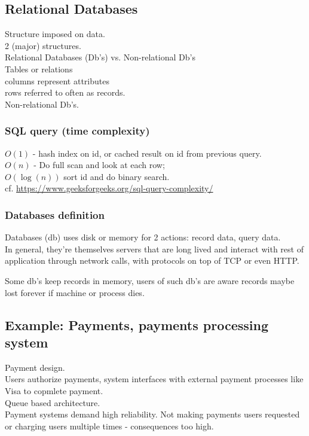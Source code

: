 \documentclass[10pt]{amsart}
\begin{document}
\subsection{Relational Databases}

Structure imposed on data. \\
2 (major) structures. \\
Relational Databases (Db's) vs. Non-relational Db's \\
Tables or relations \\
columns represent attributes \\
rows referred to often as records. \\

Non-relational Db's.

\subsubsection{SQL query (time complexity)}

$O(1)$ - hash index on id, or cached result on id from previous query. \\
$O(n)$ - Do full scan and look at each row; \\
$O(\log{(n)})$ sort id and do binary search. \\

cf. \url{https://www.geeksforgeeks.org/sql-query-complexity/}

\subsubsection{Databases definition}

Databases (db) uses disk or memory for 2 actions: record data, query data. \\
In general, they're themselves servers that are long lived and interact with rest of application through network calls, with protocols on top of TCP or even HTTP. 

Some db's keep records in memory, users of such db's are aware records maybe lost forever if machine or process dies.




\subsection{Example: Payments, payments processing system}

Payment design. \\
Users authorize payments, system interfaces with external payment processes like Visa to copmlete payment. \\
Queue based architecture. \\
Payment systems demand high reliability. Not making payments users requested or charging users multiple times - consequences too high. 
\end{document}

